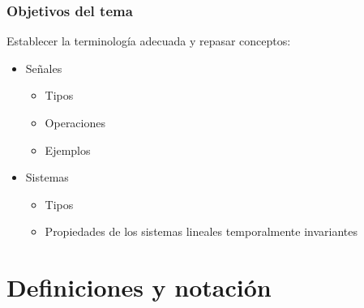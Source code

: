 \begin{frame}\frametitle{Objetivos del tema}
  \alert{Establecer la terminología adecuada y repasar conceptos:}
  \vspace{0.1cm}
  \begin{itemize}
    \item \alert{Señales}
    \begin{itemize}
      \item Tipos
      \item Operaciones
      \item Ejemplos
    \end{itemize}
    \item \alert{Sistemas}
    \begin{itemize}
      \item Tipos
      \item Propiedades de los sistemas lineales temporalmente invariantes
    \end{itemize}
  \end{itemize}
\end{frame}


\section{Definiciones y notación}

